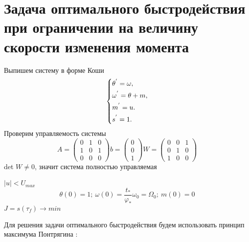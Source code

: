 \documentclass[a4paper,14pt]{article}
\theoremstyle{plain} %
\theoremstyle{definition} %
\theoremstyle{remark} %
\begin{document}
{\section{Задача оптимального быстродействия при ограничении на величину скорости изменения момента}
Выпишем систему в форме Коши
\begin{equation}\label{koshisystem}
    \left\{ {\begin{aligned}
                 & \theta^{'} = \omega , \hfill   \\
                 & \omega^{'} = \theta+m , \hfill \\
                 & m^{'} = u . \hfill             \\
                 & s^{'} = 1 . \hfill             \\
            \end{aligned}} \right.
\end{equation}
Проверим управляемость системы
\begin{equation*}
    A =
    \begin{pmatrix}
        0 & 1 & 0 \\
        1 & 0 & 1 \\
        0 & 0 & 0
    \end{pmatrix}
    b =
    \begin{pmatrix}
        0 \\
        0 \\
        1
    \end{pmatrix}
    W =
    \begin{pmatrix}
        0 & 0 & 1 \\
        0 & 1 & 0 \\
        1 & 0 & 0
    \end{pmatrix}
\end{equation*}
det $W\neq0$, значит система полностью управляемая

$|u|<U_{max}$
\[
    \theta(0)=1;\ \omega(0)=\frac{t_\ast}{\varphi_\ast}\omega_0=\Omega_0;\ m(0)=0
\]
$J=s(\tau_f)\to min$

Для решения задачи оптимального быстродействия будем использовать принцип максимума Понтрягина \cite{Specpract}:

}
\end{document}

